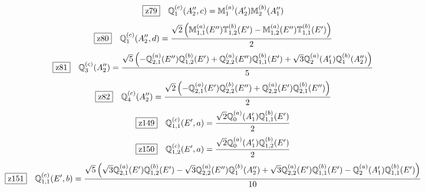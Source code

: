 \documentclass[fleqn,10pt,landscape]{jsarticle}
\begin{document}
\begin{dmath*}
\hspace*{3mm}\fbox{z79}\quad \mathbb{Q}_{1}^{(c)}(A_{2}^{\prime\prime},c)=\mathbb{M}_{1}^{(a)}(A_{2}^{\prime}) \mathbb{M}_{2}^{(b)}(A_{1}^{\prime\prime})
\end{dmath*}
\begin{dmath*}
\hspace*{3mm}\fbox{z80}\quad \mathbb{Q}_{1}^{(c)}(A_{2}^{\prime\prime},d)=\frac{\sqrt{2} \left(\mathbb{M}_{1,1}^{(a)}(E^{\prime\prime}) \mathbb{T}_{1,2}^{(b)}(E^{\prime}) - \mathbb{M}_{1,2}^{(a)}(E^{\prime\prime}) \mathbb{T}_{1,1}^{(b)}(E^{\prime})\right)}{2}
\end{dmath*}
\begin{dmath*}
\hspace*{3mm}\fbox{z81}\quad \mathbb{Q}_{3}^{(c)}(A_{2}^{\prime\prime})=\frac{\sqrt{5} \left(- \mathbb{Q}_{2,1}^{(a)}(E^{\prime\prime}) \mathbb{Q}_{1,2}^{(b)}(E^{\prime}) + \mathbb{Q}_{2,2}^{(a)}(E^{\prime\prime}) \mathbb{Q}_{1,1}^{(b)}(E^{\prime}) + \sqrt{3} \mathbb{Q}_{2}^{(a)}(A_{1}^{\prime}) \mathbb{Q}_{1}^{(b)}(A_{2}^{\prime\prime})\right)}{5}
\end{dmath*}
\begin{dmath*}
\hspace*{3mm}\fbox{z82}\quad \mathbb{Q}_{4}^{(c)}(A_{2}^{\prime\prime})=\frac{\sqrt{2} \left(- \mathbb{Q}_{2,1}^{(a)}(E^{\prime}) \mathbb{Q}_{2,2}^{(b)}(E^{\prime\prime}) + \mathbb{Q}_{2,2}^{(a)}(E^{\prime}) \mathbb{Q}_{2,1}^{(b)}(E^{\prime\prime})\right)}{2}
\end{dmath*}
\begin{dmath*}
\hspace*{3mm}\fbox{z149}\quad \mathbb{Q}_{1,1}^{(c)}(E^{\prime},a)=\frac{\sqrt{2} \mathbb{Q}_{0}^{(a)}(A_{1}^{\prime}) \mathbb{Q}_{1,1}^{(b)}(E^{\prime})}{2}
\end{dmath*}
\begin{dmath*}
\hspace*{3mm}\fbox{z150}\quad \mathbb{Q}_{1,2}^{(c)}(E^{\prime},a)=\frac{\sqrt{2} \mathbb{Q}_{0}^{(a)}(A_{1}^{\prime}) \mathbb{Q}_{1,2}^{(b)}(E^{\prime})}{2}
\end{dmath*}
\begin{dmath*}
\hspace*{3mm}\fbox{z151}\quad \mathbb{Q}_{1,1}^{(c)}(E^{\prime},b)=\frac{\sqrt{5} \left(\sqrt{3} \mathbb{Q}_{2,1}^{(a)}(E^{\prime}) \mathbb{Q}_{1,2}^{(b)}(E^{\prime}) - \sqrt{3} \mathbb{Q}_{2,2}^{(a)}(E^{\prime\prime}) \mathbb{Q}_{1}^{(b)}(A_{2}^{\prime\prime}) + \sqrt{3} \mathbb{Q}_{2,2}^{(a)}(E^{\prime}) \mathbb{Q}_{1,1}^{(b)}(E^{\prime}) - \mathbb{Q}_{2}^{(a)}(A_{1}^{\prime}) \mathbb{Q}_{1,1}^{(b)}(E^{\prime})\right)}{10}
\end{dmath*}
\end{document}
